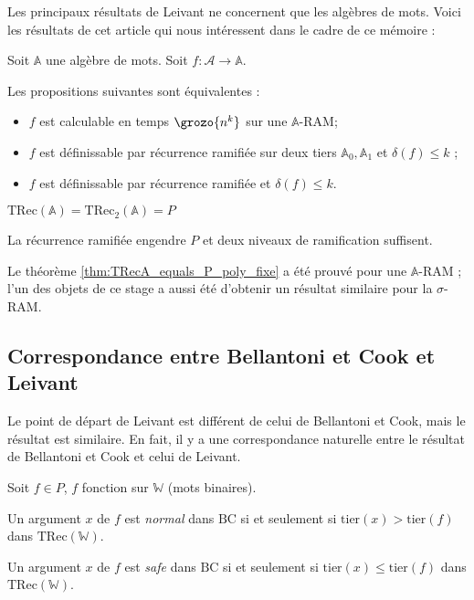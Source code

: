 \documentclass{report}
\newcommand{\bbA}{\mathbb{A}}
\newcommand{\TRec}[1]{\text{TRec}\left(\mathbb{#1}\right)}
\newcommand{\TRecd}[1]{\text{TRec}_{2}\left(\mathbb{#1}\right)}
\begin{document}
		\espace
		
		Les principaux résultats de Leivant ne concernent que les algèbres de mots. Voici les résultats de cet article \cite{Leivant1995} qui nous intéressent dans le cadre de ce mémoire :
		
		\begin{theorem}
			\label{thm:TRecA_equals_P_poly_fixe}
			Soit $\bbA$ une algèbre de mots. Soit $f : \mathcal{A} \to \bbA $.
			
			Les propositions suivantes sont équivalentes :

			\begin{itemize}[itemsep=-1mm]
				\item 	$f$ est calculable en temps $\grozo{n^k}$ sur une $\bbA$-RAM;
				\item 	$f$ est définissable par récurrence ramifiée sur deux tiers $\bbA_0, \bbA_1$ et $\delta(f) \leq k$ ;
				\item 	$f$ est définissable par récurrence ramifiée et $\delta(f) \leq k$.
			\end{itemize}
		\end{theorem}
		
		
		
		\begin{theorem}
			\label{thm:TRecA_equals_P}
			$\TRec{A} = \TRecd{A} = P$
		\end{theorem}
		
		La récurrence ramifiée engendre $P$ et deux niveaux de ramification suffisent.
	
		Le théorème \ref{thm:TRecA_equals_P_poly_fixe} a été prouvé pour une $\bbA$-RAM ; l'un des objets de ce stage a aussi été d'obtenir un résultat similaire pour la $\sigma$-RAM. 
		
		
	
		\subsection{Correspondance entre Bellantoni et Cook et Leivant}
		\label{subsec:corres_BC_Leivant}
	
		Le point de départ de Leivant est différent de celui de Bellantoni et Cook, mais le résultat est similaire. En fait, il y a une correspondance naturelle entre le résultat de Bellantoni et Cook et celui de Leivant.
		
		\begin{lemma}
			\label{lem:BC_and_Leivant}
			Soit $f \in P$, $f$ fonction sur $\mathbb{W}$ (mots binaires).
			
			Un argument $x$ de $f$ est \emph{normal} dans $\text{BC}$ si et seulement si $\text{tier}(x) > \text{tier}(f)$ dans $\TRec{W}$.
			
			Un argument $x$ de $f$ est \emph{safe} dans $\text{BC}$ si et seulement si $\text{tier}(x) \leq \text{tier}(f)$ dans $\TRec{W}$.
		\end{lemma}
		
\end{document}
